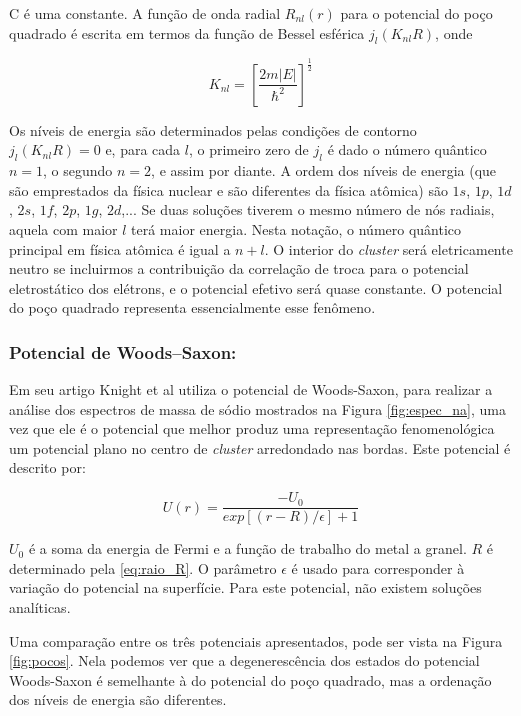 C é uma constante. A função de onda radial $R_{nl}(r)$ para o potencial do poço quadrado é escrita em termos da função de Bessel esférica $j_{l}(K_{nl}R)$, onde

\begin{equation}
    K_{nl}=\left[\frac{2m|E|}{\hbar^2}\right]^{\frac{1}{2}}
\end{equation}

Os níveis de energia são determinados pelas condições de contorno $j_{l}(K_{nl}R)=0$ e, para cada $l$, o primeiro zero de $j_l$ é dado o número quântico $n = 1$, o segundo $n = 2$, e assim por diante. A ordem dos níveis de energia (que são emprestados da física nuclear e são diferentes da física atômica) são $1s$, $1p$, $1d$, $2s$, $1f$, $2p$, $1g$, $2d$,... Se duas soluções tiverem o mesmo número de nós radiais, aquela com maior $l$ terá maior energia. Nesta notação, o número quântico principal em física atômica é igual a $n + l$. O interior do \textit{cluster} será eletricamente neutro se incluirmos a contribuição da correlação de troca para o potencial eletrostático dos elétrons, e o potencial efetivo será quase constante. O potencial do poço quadrado representa essencialmente esse fenômeno\cite{livro_cap16_Misra2012527}.


\subsubsection{Potencial de Woods–Saxon:}

Em seu artigo Knight et al\cite{electronic_Shell_sodium} utiliza o potencial de Woods-Saxon, para realizar a análise dos espectros de massa de sódio mostrados na Figura \ref{fig:espec_na}\cite{livro_cap16_Misra2012527}, uma vez que ele é o potencial que melhor produz uma representação fenomenológica um potencial plano no centro de \textit{cluster} arredondado nas bordas. Este potencial é descrito por:

\begin{equation}
    U(r)=\frac{-U_0}{exp[(r-R)/\epsilon]+1}
\end{equation}


$U_0$ é a soma da energia de Fermi e a função de trabalho do metal a granel. $R$ é determinado pela \ref{eq:raio_R}. O parâmetro $\epsilon$ é usado para corresponder à variação do potencial na superfície. Para este potencial, não existem soluções analíticas.


Uma comparação entre os três potenciais apresentados, pode ser vista na Figura \ref{fig:pocos}. Nela podemos ver que a degenerescência dos estados do potencial Woods-Saxon é semelhante à do potencial do poço quadrado, mas a ordenação dos níveis de energia são diferentes.

